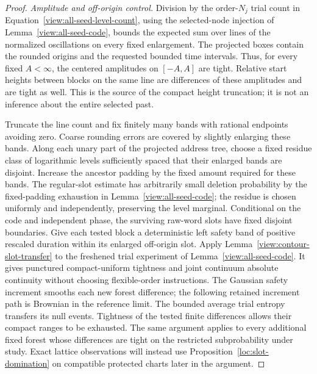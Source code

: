 \begin{proof}
\emph{Amplitude and off-origin control.}
Division by the order-$N_j$ trial count in
Equation~\eqref{view:all-seed-level-count}, using the selected-node
injection of Lemma~\ref{view:all-seed-code}, bounds the expected sum
over lines of the normalized oscillations on every fixed enlargement.
The projected boxes contain the rounded origins and the requested
bounded time intervals.  Thus, for every fixed $A<\infty$,
the centered amplitudes on $[-A,A]$ are tight.  Relative start heights
between blocks on the same line are differences of these amplitudes
and are tight as well.  This is the source of the compact height
truncation; it is not an inference about the entire selected past.

Truncate the line count and fix finitely many bands with rational
endpoints avoiding zero.  Coarse rounding errors are covered by slightly
enlarging these bands.  Along each unary part of the projected address
tree, choose a fixed residue class of logarithmic levels sufficiently
spaced that their enlarged bands are disjoint.  Increase the ancestor
padding by the fixed amount required for these bands.  The regular-slot
estimate has arbitrarily small deletion probability by the fixed-padding
exhaustion in Lemma~\ref{view:all-seed-code}; the residue is chosen
uniformly and independently, preserving the level marginal.  Conditional
on the code and independent phase, the surviving raw-word slots have
fixed disjoint boundaries.  Give each tested block a deterministic left
safety band of positive rescaled duration within its enlarged off-origin
slot.  Apply Lemma~\ref{view:contour-slot-transfer} to the freshened
trial experiment of Lemma~\ref{view:all-seed-code}.  It gives punctured
compact-uniform tightness and joint continuum absolute continuity
without choosing flexible-order instructions.  The Gaussian safety
increment smooths each new forest difference; the following retained
increment path is Brownian in the reference limit.  The bounded average
trial entropy transfers its null events.  Tightness of the tested
finite differences allows their compact ranges to be exhausted.
The same argument applies to every additional fixed forest whose
differences are tight on the restricted subprobability under study.
Exact lattice observations will instead use
Proposition~\ref{loc:slot-domination} on compatible protected charts
later in the argument.


\end{proof}
